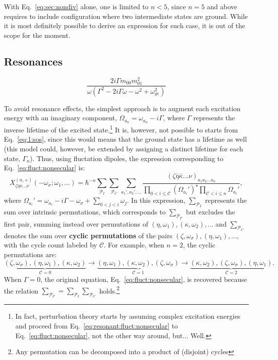 \documentclass[12pt,a4paper]{article}
\begin{document}
With Eq.~\eqref{eq:sec:nondiv}  alone, one is limited to $n<5$, since $n=5$ and above requires to include configuration where two intermediate states are ground. While it is most definitely possible to derive an expression for such case, it is out of the scope for the moment.

\subsection{Resonances}

\begin{equation}\frac{2 i \Gamma m_{00} m_{01}^{2}}{\omega \left(\Gamma^{2} - 2 i \Gamma \omega - \omega^{2} + \omega_{ge}^{2}\right)}
\end{equation}



To avoid resonance effects, the simplest approach is to augment each excitation energy with an imaginary component, $\Omega_{a_n} = \omega_{a_n} - i\Gamma$, where $\Gamma$ represents the inverse lifetime of the excited state.\footnote{In fact, perturbation theory starts by assuming complex excitation energies and proceed from Eq.~\eqref{eq:resonant:fluct:nonsecular} to Eq.~\eqref{eq:fluct:nonsecular}, not the other way around, but... Well.} It is, however, not possible to starts from Eq.~\eqref{eq:1:sos}, since this would means that the ground state has a lifetime as well (this model could, however, be extended by assigning a distinct lifetime for each state, $\Gamma_n$). 
Thus, using fluctation dipoles, the expression corresponding to Eq.~\eqref{eq:fluct:nonsecular} is:\begin{equation}
X^{(n,+)}_{\zeta \eta \kappa \ldots \nu}(-\omega_\sigma; \omega_1, \ldots) = \hbar^{-n} \sum_{\mathcal{P}_I}\sum_{\mathcal{P}_C} \sum_{a_1', a_2', \ldots} \frac{(\zeta \bar{\eta} \bar{\kappa} \ldots \nu)_{a_1 a_2 \ldots a_n}}{\prod_{0 < i \leq \mathcal C} (\Omega_{a_i}')^\star \prod_{\mathcal C < i \leq n} \Omega_{a_i}'},\label{eq:resonant:fluct:nonsecular}
\end{equation}
where $\Omega_{a_i}' = \omega_{a_i} - i\Gamma - \omega_\sigma + \sum_{0 < j < i} \omega_j$.
In this expression, $\sum_{\mathcal{P}_I}$ represents the sum over intrinsic permutations, which corresponds to $\sum_{\mathcal{P}_F}$ but excludes the first pair, summing instead over permutations of $(\eta, \omega_1), (\kappa, \omega_2), \ldots$ and $\sum_{\mathcal{P}_C}$ denotes the sum over \textbf{cyclic permutations} of the pairs $(\zeta, \omega_\sigma), (\eta, \omega_1), \ldots$, with the cycle count labeled by $\mathcal{C}$.
For example, when $n = 2$, the cyclic permutations are:
\begin{equation*}
\underbrace{(\zeta,\omega_\sigma),(\eta,\omega_1),(\kappa,\omega_2)}_{\mathcal{C} = 0} \rightarrow \underbrace{(\eta,\omega_1),(\kappa,\omega_2),(\zeta,\omega_\sigma)}_{\mathcal{C} = 1} \rightarrow \underbrace{(\kappa,\omega_2),(\zeta,\omega_\sigma),(\eta,\omega_1)}_{\mathcal{C} = 2}.
\end{equation*}
When $\Gamma = 0$, the original equation, Eq.~\eqref{eq:fluct:nonsecular}, is recovered because the relation $\sum_{\mathcal{P}_F} = \sum_{\mathcal{P}_I} \sum_{\mathcal{P}_C}$ holds.\footnote{Any permutation can be decomposed into a product of (disjoint) cycles} 
\end{document}

